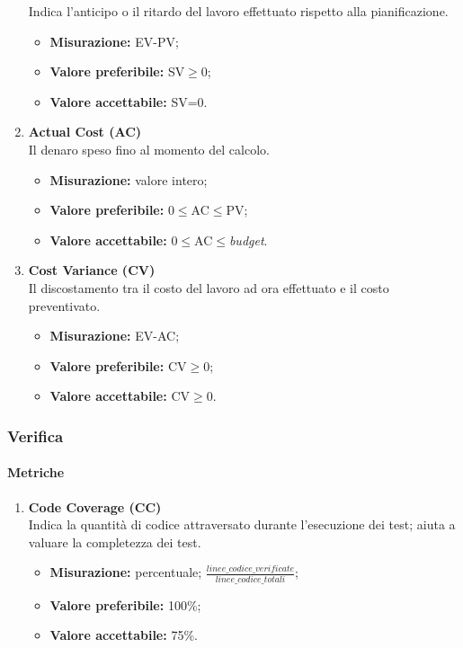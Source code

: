 \begin{enumerate}
			Indica l'anticipo o il ritardo del lavoro effettuato rispetto alla pianificazione.
			\begin{itemize}
				\item \textbf{Misurazione:} EV-PV;
				\item \textbf{Valore preferibile:} SV$\geq$0;
				\item \textbf{Valore accettabile:} SV=0.
			\end{itemize}
		\item[]
			\textbf{Actual Cost (AC)}\\
			Il denaro speso fino al momento del calcolo.
			\begin{itemize}
				\item \textbf{Misurazione:} valore intero;
				\item \textbf{Valore preferibile:} 0$\leq$AC$\leq$PV;
				\item \textbf{Valore accettabile:} 0$\leq$AC$\leq$\textit{budget}.
			\end{itemize}
		\item[]
			\textbf{Cost Variance (CV)}\\
			Il discostamento tra il costo del lavoro ad ora effettuato e il costo preventivato.
			\begin{itemize}
				\item \textbf{Misurazione:} EV-AC;
				\item \textbf{Valore preferibile:} CV$\geq$0;
				\item \textbf{Valore accettabile:} CV$\geq$0.
			\end{itemize}
		\end{enumerate}
	\subsubsection{Verifica}
		\paragraph{Metriche} 
		\begin{enumerate}
		\item[]	
			\textbf{Code Coverage (CC)}\\
			Indica la quantità di codice attraversato durante l'esecuzione dei test; aiuta a valuare la completezza dei test.
			\begin{itemize}
				\item \textbf{Misurazione:} percentuale; $\frac{linee\_codice\_verificate}{linee\_codice\_totali}$;
				\item \textbf{Valore preferibile:} 100\%;
				\item \textbf{Valore accettabile:} 75\%.
			\end{itemize}
		\end{enumerate}
